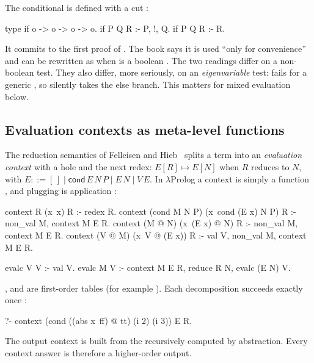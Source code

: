 {{\begin{pitfall}
The conditional is defined with a cut :
\begin{lprolog}
type if   o -> o -> o -> o.
if P Q R :- P, !, Q.
if P Q R :- R.
\end{lprolog}
It commits to the first proof of . The book says it is used ``only for convenience'' and can be
rewritten as  when  is a boolean . The two readings differ on a non-boolean test. They also differ, more seriously, on an
\emph{eigenvariable} test:  fails for a generic , so  silently takes the else
branch. This matters for mixed evaluation below.
\end{pitfall}

\subsection{Evaluation contexts as meta-level functions}\label{sec:apps-evalc}

The reduction semantics of Felleisen and Hieb~\cite{FelleisenHieb1992} splits a term into an
\emph{evaluation context} with a hole and the next redex: $E[R]\longmapsto E[N]$ when $R$ reduces to $N$,
with $E ::= [\,]\mid \mathsf{cond}\,E\,N\,P\mid E\,N\mid V\,E$. In $\lambda$Prolog a context is simply a
function , and plugging is application :

\begin{lprolog}
context R (x\ x) R :- redex R.
context (cond M N P) (x\ cond (E x) N P) R :-
    non_val M, context M E R.
context (M @ N) (x\ (E x) @ N) R :-
    non_val M, context M E R.
context (V @ M) (x\ V @ (E x)) R :-
    val V, non_val M, context M E R.

evalc V V :- val V.
evalc M V :- context M E R, reduce R N, evalc (E N) V.
\end{lprolog}

\noindent {},  and  are first-order tables (for example
). Each decomposition succeeds exactly once :
\begin{lprolog}
?- context (cond ((abs x\ ff) @ tt) (i 2) (i 3)) E R.
\end{lprolog}
\noindent The output context  is built from the recursively computed  by
abstraction. Every context answer is therefore a higher-order output.

}}
